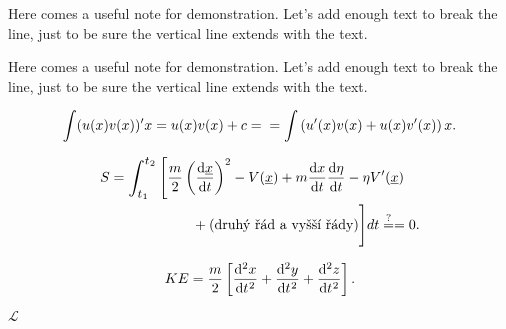 \documentclass[11pt]{article}
\begin{document}
  \blindtext
  \begin{note}
      Here comes a useful note for demonstration. Let's add enough text to break the line, just to
      be sure the vertical line extends with the text.
  \end{note}

  \begin{note}[borderline west={2pt}{0pt}{blue}, colback=yellow, drop shadow={red,opacity=0.6}]
      Here comes a useful note for demonstration. Let's add enough text to break the line, just to
      be sure the vertical line extends with the text.
  \end{note}

  \begin{fleqn}[\parindent] 
    \begin{equation}
      \int(u(x)v(x))'{x} = u(x)v(x) + c  =  \\
      = \int\left(u'(x)v(x)+u(x)v'(x)\right){x}.
    \end{equation}
  \end{fleqn}

  \begin{equation*}
  \begin{multlined}
    S = \scalerel{\int_{t_1}^{t_2}}{
      \left[
          \frac{m}{2}\left(\diff{\underline{x}}{t}\right)^2-V(\underline{x}) 
           + m\diff{x}{t}\diff{\eta}{t} - \eta V'(\underline{x}) 
      \right.} \\
          + (\text{druhý řád a vyšší řády})
      \Bigg]
    dt  \stackrel{?}{=} = 0.
  \end{multlined}
  \end{equation*}
  
  \blindtext
  \begin{equation*}
    KE = \dfrac{m}{2}\left[\diff[2]{x}{t} +\diff[2]{y}{t} + \diff[2]{z}{t}\right].
  \end{equation*}

  \(\mathcal{L}\)
\end{document}
